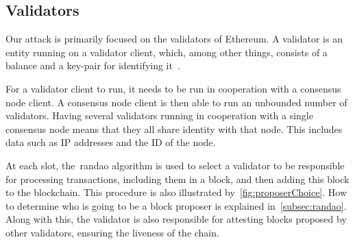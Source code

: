 %
%

\subsection{Validators}\label{subsec:validator}
Our attack is primarily focused on the validators of Ethereum.
A validator is an entity running on a validator client,
which, among other things, consists of a balance and a key-pair for identifying it~\cite{Staking}.

For a validator client to run, it needs to be run in cooperation with a consensus node client.
A consensus node client is then able to run an unbounded number of validators.
Having several validators running in cooperation with a single consensus node means that they all share identity with that node.
This includes data such as IP addresses and the ID of the node.

At each slot, the~\gls{randao} algorithm is used to select a validator to be responsible for processing transactions,
including them in a block,
and then adding this block to the blockchain.
This procedure is also illustrated by~\autoref{fig:proposerChoice}.
How to determine who is going to be a block proposer is explained in~\autoref{subsec:randao}.
Along with this, the validator is also responsible for attesting blocks proposed by other validators,
ensuring the liveness of the chain.


